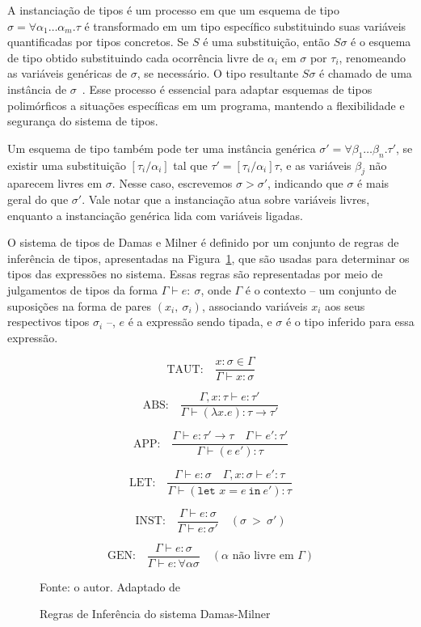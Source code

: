A instanciação de tipos é um processo em que um esquema de tipo $\sigma = \forall \alpha_1 \ldots \alpha_m. \tau$ é transformado em um tipo específico substituindo suas variáveis quantificadas por tipos concretos.
Se $S$ é uma substituição, então $S\sigma$ é o esquema de tipo obtido substituindo cada ocorrência livre de $\alpha_i$ em $\sigma$ por $\tau_i$, renomeando as variáveis genéricas de $\sigma$, se necessário.
O tipo resultante $S\sigma$ é chamado de uma instância de $\sigma$~\cite{damas1982principal}.
Esse processo é essencial para adaptar esquemas de tipos polimórficos a situações específicas em um programa, mantendo a flexibilidade e segurança do sistema de tipos.

Um esquema de tipo também pode ter uma instância genérica $\sigma' = \forall \beta_1 \ldots \beta_n. \tau'$, se existir uma substituição $[ \tau_i / \alpha_i ]$ tal que $\tau' = [\tau_i / \alpha_i]\tau$, e as variáveis $\beta_j$ não aparecem livres em $\sigma$.
Nesse caso, escrevemos $\sigma > \sigma'$, indicando que $\sigma$ é mais geral do que $\sigma'$.
Vale notar que a instanciação atua sobre variáveis livres, enquanto a instanciação genérica lida com variáveis ligadas.

O sistema de tipos de Damas e Milner é definido por um conjunto de regras de inferência de tipos, apresentadas na Figura~\ref{eq:type-inference}, que são usadas para determinar os tipos das expressões no sistema.
Essas regras são representadas por meio de julgamentos de tipos da forma $\Gamma \vdash e{:}\ \sigma$, onde $\Gamma$ é o contexto -- um conjunto de suposições na forma de pares $(x_i,\ \sigma_i)$, associando variáveis $x_i$ aos seus respectivos tipos $\sigma_i$ --, $e$ é a expressão sendo tipada, e $\sigma$ é o tipo inferido para essa expressão.

\begin{figure}[ht!]
  \centering
  \[
    \text{TAUT:} \quad \frac{x : \sigma \in \Gamma}{\Gamma \vdash x : \sigma}
  \]

  \[
    \text{ABS:} \quad \frac{\Gamma, x : \tau \vdash e : \tau'}{\Gamma \vdash (\lambda x. e) : \tau \to \tau'}
  \]

  \[
    \text{APP:} \quad \frac{\Gamma \vdash e : \tau' \to \tau \quad \Gamma \vdash e' : \tau'}{\Gamma \vdash (e \ e') : \tau}
  \]

  \[
    \text{LET:} \quad \frac{\Gamma \vdash e : \sigma \quad \Gamma, x : \sigma \vdash e' : \tau}{\Gamma \vdash (\texttt{let } x = e \ \texttt{in} \ e') : \tau}
  \]

  \[
    \text{INST:} \quad \frac{\Gamma \vdash e : \sigma}{\Gamma \vdash e : \sigma'} \quad \scriptstyle (\sigma\ >\ \sigma')
  \]

  \[
    \text{GEN:} \quad \frac{\Gamma \vdash e : \sigma}{\Gamma \vdash e : \forall \alpha \sigma} \quad \scriptstyle (\alpha \text{ não livre em } \Gamma)
  \]

  \caption{Regras de Inferência do sistema Damas-Milner}
  \small{Fonte: o autor. Adaptado de~\cite{damas1982principal}}\label{eq:type-inference}
\end{figure}

